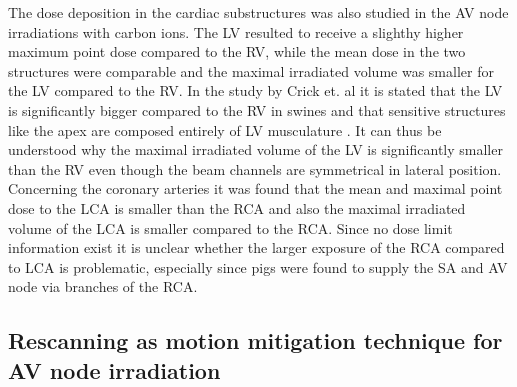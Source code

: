 \newline
The dose deposition in the cardiac substructures was also studied in the AV node irradiations with carbon ions. The LV resulted 
to receive a slighthy higher maximum point dose compared to the RV, while the mean dose in the two structures were comparable and the 
maximal irradiated volume was smaller for the LV compared to the RV. In the study by Crick et. al it is stated that the LV is significantly 
bigger compared to the RV in swines and that sensitive structures like the apex are composed entirely of LV musculature \cite{Cri98}. It can 
thus be understood why the maximal irradiated volume of the LV is significantly smaller than the RV even though the beam channels are 
symmetrical in lateral position. Concerning the coronary arteries it was found that the mean and maximal point dose to the LCA is smaller than 
the RCA and also the maximal irradiated volume of the LCA is smaller compared to the RCA. Since no dose limit information exist it is unclear 
whether the larger exposure of the RCA compared to LCA is problematic, especially since pigs were found to supply the SA and AV node via branches of the RCA.


\vspace*{-0.3cm}
\subsection{Rescanning as motion mitigation technique for AV node irradiation}

